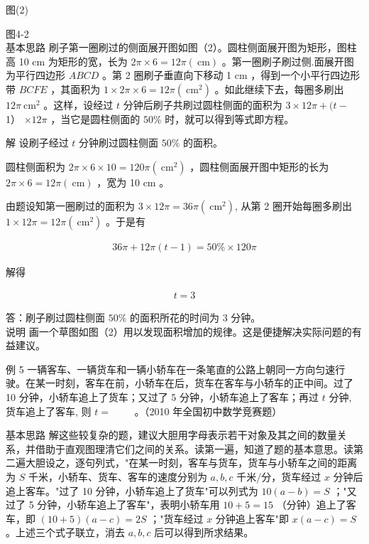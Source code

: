 \documentclass[10pt]{article}
\begin{document}
图(2)

图4-2\\
基本思路 刷子第一圈刷过的侧面展开图如图（2）。圆柱侧面展开图为矩形，图柱高 10 cm 为矩形的宽，长为 $2 \pi \times 6=12 \pi(\mathrm{~cm})$ 。第一圈刷子刷过侧.面展开图为平行四边形 $A B C D$ 。第 2 圈刷子垂直向下移动 1 cm ，得到一个小平行四边形带 $B C F E$ ，其面积为 $1 \times 2 \pi \times 6=12 \pi\left(\mathrm{~cm}^{2}\right)$ 。如此继续下去，每圈多刷出 $12 \pi \mathrm{~cm}^{2}$ 。这样，设经过 $t$ 分钟后刷子共刷过圆柱侧面的面积为 $3 \times 12 \pi+(t-$ 1） $\times 12 \pi$ ，当它是圆柱侧面的 $50 \%$ 时，就可以得到等式即方程。

解 设刷子经过 $t$ 分钟刷过圆柱侧面 $50 \%$ 的面积。

圆柱侧面积为 $2 \pi \times 6 \times 10=120 \pi\left(\mathrm{~cm}^{2}\right)$ ，圆柱侧面展开图中矩形的长为 $2 \pi \times 6=12 \pi(\mathrm{~cm})$ ，宽为 10 cm 。

由题设知第一圈刷过的面积为 $3 \times 12 \pi=36 \pi\left(\mathrm{~cm}^{2}\right)$, 从第 2 圈开始每圈多刷出 $1 \times 12 \pi=12 \pi\left(\mathrm{~cm}^{2}\right)$ 。于是有

\begin{align*}
36 \pi+12 \pi(t-1)=50 \% \times 120 \pi
\end{align*}

解得

\begin{align*}
t=3
\end{align*}

答：刷子刷过圆柱侧面 $50 \%$ 的面积所花的时间为 3 分钟。\\
说明 画一个草图如图（2）用以发现面积增加的规律。这是便捷解决实际问题的有益建议。

例 5 一辆客车、一辆货车和一辆小轿车在一条笔直的公路上朝同一方向匀速行驶。在某一时刻，客车在前，小轿车在后，货车在客车与小轿车的正中间。过了 10 分钟，小轿车追上了货车；又过了 5 分钟，小轿车追上了客车；再过 $t$ 分钟, 货车追上了客车, 则 $t=$ $\qquad$。（2010 年全国初中数学竞赛题）

基本思路 解这些较复杂的题，建议大胆用字母表示若干对象及其之间的数量关系，并借助于直观图理清它们之间的关系。读第一遍，知道了题的基本意思。读第二遍大胆设之，逐句列式，"在某一时刻，客车与货车，货车与小轿车之间的距离为 $S$ 千米，小轿车、货车、客车的速度分别为 $a, b, c$ 千米/分，货车经过 $x$ 分钟后追上客车。"过了 10 分钟，小轿车追上了货车"可以列式为 $10(a-b)=S$ ；"又过了 5 分钟，小轿车追上了客车"，表明小轿车用 $10+5=15$ （分钟）追上了客车，即 $(10+5)(a-c)=2 S$ ；"货车经过 $x$ 分钟追上客车"即 $x(a-c)=S$ 。上述三个式子联立，消去 $a, b, c$ 后可以得到所求结果。
\end{document}
